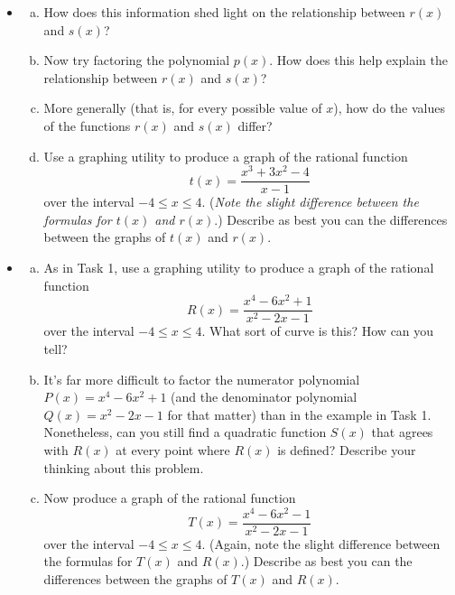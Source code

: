 \documentclass[11pt]{article}
\newcounter{tasknumb}
\newcommand{\tasknumb}[1]{\refstepcounter{tasknumb}\textmd{\textbf{$\fbox{$\fbox{Task \thetasknumb}$}$}}#1}
\newenvironment{task}[1][]%
 {\begin{itemize}
 \item[\tasknumb{#1}] }
{
    \end{itemize}    }%
\begin{document}
\begin{task}[\label{factorable}]
\begin{enumerate}[(a)]
\item[] How does this information shed light on the relationship between $r(x)$ and $s(x)$? \\
\item Now try factoring the polynomial $p(x)$. How does this help explain the relationship between $r(x)$ and $s(x)$? \\
\item More generally (that is, for every possible value of $x$), how do the values of the functions $r(x)$ and $s(x)$ differ? \\
\item Use a graphing utility to produce a graph of the rational function $$t(x)=\frac{x^3+3x^2-4}{x-1}$$over the interval $-4 \le x \le 4$. (\emph{Note the slight difference between the formulas for $t(x)$ and $r(x)$}.) Describe as best you can the differences between the graphs of $t(x)$ and $r(x)$.
\end{enumerate}
\end{task}

\newpage
\begin{task}[\label{not_so_easy}]
\begin{enumerate}[(a)] \itemsep -8pt
\item As in Task 1, use a graphing utility to produce a graph of the rational function $$R(x)=\frac{x^4-6x^2+1}{x^2-2x-1}$$over the interval $-4 \le x \le 4$. What sort of curve is this? How can you tell? \\
\item It's far more difficult to factor the numerator polynomial $P(x)=x^4-6x^2+1$ (and the denominator polynomial $Q(x)=x^2-2x-1$ for that matter) than in the example in Task 1. Nonetheless, can you still find a quadratic function $S(x)$ that agrees with $R(x)$ at every point where $R(x)$ is defined? Describe your thinking about this problem. \\
\item Now produce a graph of the rational function $$T(x)=\frac{x^4-6x^2-1}{x^2-2x-1}$$ over the interval $-4 \le x \le 4$. (Again, note the slight difference between the formulas for $T(x)$ and $R(x)$.) Describe as best you can the differences between the graphs of $T(x)$ and $R(x)$.
\end{enumerate}
\end{task}
\end{document}
